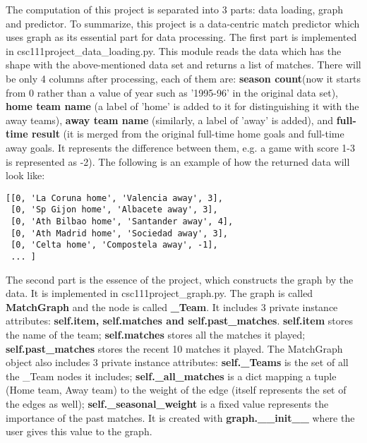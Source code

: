 \documentclass[fontsize=11pt]{article}
\begin{document}
The computation of this project is separated into 3 parts: data loading, graph and predictor. To summarize, this project is a data-centric match predictor which uses graph as its essential part for data processing.
\newline
\newline
The first part is implemented in csc111project\_data\_loading.py. This module reads the data which has the shape with the above-mentioned data set and returns a list of matches. There will be only 4 columns after processing, each of them are: \textbf{season count}(now it starts from 0 rather than a value of year such as '1995-96' in the original data set), \textbf{home team name} (a label of 'home' is added to it for distinguishing it with the away teams), \textbf{away team name} (similarly, a label of 'away' is added), and \textbf{full-time result} (it is merged from the original full-time home goals and full-time away goals. It represents the difference between them, e.g. a game with score 1-3 is represented as -2). The following is an example of how the returned data will look like: 
\begin{verbatim}
[[0, 'La Coruna home', 'Valencia away', 3],
 [0, 'Sp Gijon home', 'Albacete away', 3],
 [0, 'Ath Bilbao home', 'Santander away', 4],
 [0, 'Ath Madrid home', 'Sociedad away', 3],
 [0, 'Celta home', 'Compostela away', -1],
 ... ]
\end{verbatim}
The second part is the essence of the project, which constructs the graph by the data. It is implemented in csc111project\_graph.py. The graph is called \textbf{MatchGraph} and the node is called \textbf{\_Team}. It includes 3 private instance attributes: \textbf{self.item, self.matches and self.past\_matches}. \textbf{self.item} stores the name of the team; \textbf{self.matches} stores all the matches it played; \textbf{self.past\_matches} stores the recent 10 matches it played. The MatchGraph object also includes 3 private instance attributes: \textbf{self.\_Teams} is the set of all the \_Team nodes it includes; \textbf{self.\_all\_matches} is a dict mapping a tuple (Home team, Away team) to the weight of the edge (itself represents the set of the edges as well); \textbf{self.\_seasonal\_weight} is a fixed value represents the importance of the past matches. It is created with \textbf{graph.\_\_init\_\_} where the user gives this value to the graph.
\newline
\newline
\end{document}
